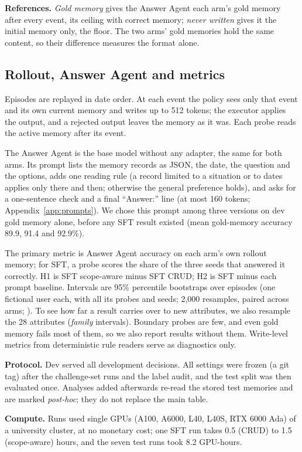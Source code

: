 \documentclass[11pt]{article}
\begin{document}
\textbf{References.} \emph{Gold memory} gives the Answer Agent each arm's gold memory after every event, its ceiling with correct memory; \emph{never written} gives it the initial memory only, the floor. The two arms' gold memories hold the same content, so their difference measures the format alone.

\subsection{Rollout, Answer Agent and metrics}
Episodes are replayed in date order. At each event the policy sees only that event and its own current memory and writes up to 512 tokens; the executor applies the output, and a rejected output leaves the memory as it was. Each probe reads the active memory after its event.

The Answer Agent is the base model without any adapter, the same for both arms. Its prompt lists the memory records as JSON, the date, the question and the options, adds one reading rule (a record limited to a situation or to dates applies only there and then; otherwise the general preference holds), and asks for a one-sentence check and a final ``Answer:'' line (at most 160 tokens; Appendix~\ref{app:prompts}). We chose this prompt among three versions on dev gold memory alone, before any SFT result existed (mean gold-memory accuracy 89.9, 91.4 and 92.9\%).

The primary metric is Answer Agent accuracy on each arm's own rollout memory; for SFT, a probe scores the share of the three seeds that answered it correctly. H1 is SFT scope-aware minus SFT CRUD; H2 is SFT minus each prompt baseline. Intervals are 95\% percentile bootstraps over episodes (one fictional user each, with all its probes and seeds; 2,000 resamples, paired across arms; \citealp{efron1993bootstrap}). To see how far a result carries over to new attributes, we also resample the 28 attributes (\emph{family} intervals). Boundary probes are few, and even gold memory fails most of them, so we also report results without them. Write-level metrics from deterministic rule readers serve as diagnostics only.

\textbf{Protocol.} Dev served all development decisions. All settings were frozen (a git tag) after the challenge-set runs and the label audit, and the test split was then evaluated once. Analyses added afterwards re-read the stored test memories and are marked \emph{post-hoc}; they do not replace the main table.

\textbf{Compute.} Runs used single GPUs (A100, A6000, L40, L40S, RTX 6000 Ada) of a university cluster, at no monetary cost; one SFT run takes 0.5 (CRUD) to 1.5 (scope-aware) hours, and the seven test runs took 8.2 GPU-hours.
\end{document}

